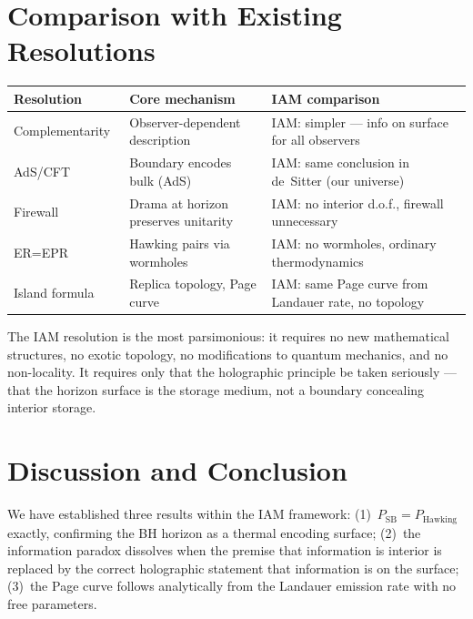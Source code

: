 \documentclass[12pt,letterpaper]{article}
\begin{document}
\section{Comparison with Existing Resolutions}

\begin{center}
\begin{tabular}{p{}p{}p{}}
\toprule
\textbf{Resolution} & \textbf{Core mechanism} & \textbf{IAM comparison} \\
\midrule
Complementarity~\cite{Susskind1993} & Observer-dependent description & IAM: simpler --- info on surface for all observers \\[4pt]
AdS/CFT~\cite{Maldacena1997} & Boundary encodes bulk (AdS) & IAM: same conclusion in de~Sitter (our universe) \\[4pt]
Firewall~\cite{AMPS2012} & Drama at horizon preserves unitarity & IAM: no interior d.o.f., firewall unnecessary \\[4pt]
ER=EPR~\cite{MaldacenaSusskind2013} & Hawking pairs via wormholes & IAM: no wormholes, ordinary thermodynamics \\[4pt]
Island formula~\cite{Almheiri2020} & Replica topology, Page curve & IAM: same Page curve from Landauer rate, no topology \\
\bottomrule
\end{tabular}
\end{center}

The IAM resolution is the most parsimonious: it requires no new
mathematical structures, no exotic topology, no modifications to
quantum mechanics, and no non-locality. It requires only that the
holographic principle be taken seriously --- that the horizon surface
is the storage medium, not a boundary concealing interior storage.

\section{Discussion and Conclusion}

We have established three results within the IAM framework:
(1)~$P_\text{SB} = P_\text{Hawking}$ exactly, confirming the BH horizon
as a thermal encoding surface;
(2)~the information paradox dissolves when the premise that information
is interior is replaced by the correct holographic statement that
information is on the surface;
(3)~the Page curve follows analytically from the Landauer emission rate
with no free parameters.
\end{document}

